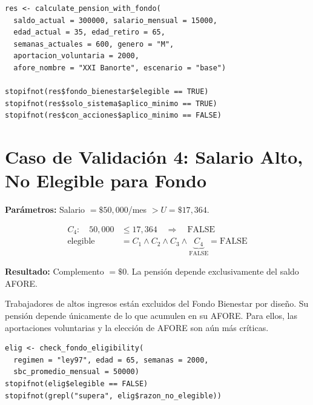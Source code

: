 \documentclass[11pt,a4paper]{report}
\theoremstyle{remark}
\begin{document}
\begin{tcolorbox}[colback=orange!5!white, colframe=orange!75!black, title=\textbf{Aplicaci\'on en C\'odigo}]
\begin{lstlisting}
res <- calculate_pension_with_fondo(
  saldo_actual = 300000, salario_mensual = 15000,
  edad_actual = 35, edad_retiro = 65,
  semanas_actuales = 600, genero = "M",
  aportacion_voluntaria = 2000,
  afore_nombre = "XXI Banorte", escenario = "base")

stopifnot(res$fondo_bienestar$elegible == TRUE)
stopifnot(res$solo_sistema$aplico_minimo == TRUE)
stopifnot(res$con_acciones$aplico_minimo == FALSE)
\end{lstlisting}
\end{tcolorbox}

\section{Caso de Validaci\'on 4: Salario Alto, No Elegible para Fondo}

\begin{tcolorbox}[colback=blue!5!white, colframe=blue!75!black, title=\textbf{Definici\'on Formal}]
\textbf{Par\'ametros:} Salario $= \$50{,}000$/mes $> U = \$17{,}364$.

\begin{align}
C_4: \quad 50{,}000 &\leq 17{,}364 \quad \Rightarrow \quad \text{FALSE} \\
\text{elegible} &= C_1 \wedge C_2 \wedge C_3 \wedge \underbrace{C_4}_{\text{FALSE}} = \text{FALSE}
\end{align}

\textbf{Resultado:} Complemento $= \$0$. La pensi\'on depende exclusivamente del saldo AFORE.
\end{tcolorbox}

\begin{tcolorbox}[colback=green!5!white, colframe=green!50!black, title=\textbf{Intuici\'on}]
Trabajadores de altos ingresos est\'an excluidos del Fondo Bienestar por dise\~no. Su pensi\'on depende \'unicamente de lo que acumulen en su AFORE. Para ellos, las aportaciones voluntarias y la elecci\'on de AFORE son a\'un m\'as cr\'iticas.
\end{tcolorbox}

\begin{tcolorbox}[colback=orange!5!white, colframe=orange!75!black, title=\textbf{Aplicaci\'on en C\'odigo}]
\begin{lstlisting}
elig <- check_fondo_eligibility(
  regimen = "ley97", edad = 65, semanas = 2000,
  sbc_promedio_mensual = 50000)
stopifnot(elig$elegible == FALSE)
stopifnot(grepl("supera", elig$razon_no_elegible))
\end{lstlisting}
\end{tcolorbox}
\end{document}
